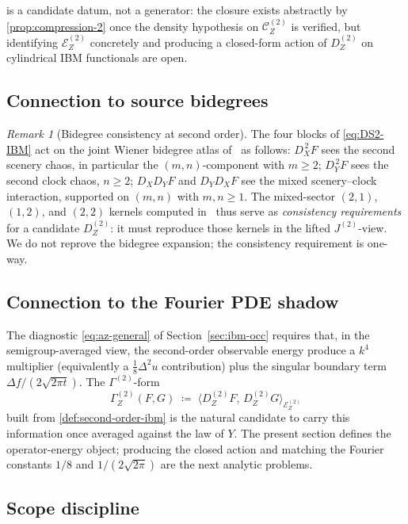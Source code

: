 \documentclass[11pt,reqno]{amsart}
\theoremstyle{plain}
\theoremstyle{definition}
\theoremstyle{remark}
\newtheorem{remark}[theorem]{Remark}
\newcommand{\Energy}{\mathcal{E}}
\newcommand{\IBM}{Z}
\newcommand{\Carre}{\Gamma}
\begin{document}
 is a candidate datum, not a generator: the
closure exists abstractly by \cref{prop:compression-2} once the density
hypothesis on $\mathcal C_\IBM^{(2)}$ is verified, but identifying
$\Energy_\IBM^{(2)}$ concretely and producing a closed-form action of
$D_\IBM^{(2)}$ on cylindrical IBM functionals are open.

\subsection*{Connection to source bidegrees}

\begin{remark}[Bidegree consistency at second order]\label{rem:bidegree-2}
The four blocks of \eqref{eq:DS2-IBM} act on the joint Wiener bidegree
atlas of~\cite{Fontes-IBMchaos} as follows: $D_X^{\,2}F$ sees the
second scenery chaos, in particular the $(m,n)$-component with
$m\ge 2$; $D_Y^{\,2}F$ sees the second clock chaos, $n\ge 2$;
$D_XD_YF$ and $D_YD_XF$ see the mixed scenery--clock interaction,
supported on $(m,n)$ with $m,n\ge 1$. The mixed-sector $(2,1)$,
$(1,2)$, and $(2,2)$ kernels computed in~\cite{Fontes-IBMchaos} thus
serve as \emph{consistency requirements} for a candidate
$D_\IBM^{(2)}$: it must reproduce those kernels in the lifted
$J^{(2)}$-view. We do not reprove the bidegree expansion; the
consistency requirement is one-way.
\end{remark}

\subsection*{Connection to the Fourier PDE shadow}

The diagnostic \eqref{eq:az-general} of Section~\ref{sec:ibm-occ}
requires that, in the semigroup-averaged view, the second-order
observable energy produce a $k^{4}$ multiplier (equivalently a
$\tfrac18\Delta^{2}u$ contribution) plus the singular boundary term
$\Delta f/(2\sqrt{2\pi t})$. The $\Carre^{(2)}$-form
\[
  \Carre^{(2)}_\IBM(F,G)
  \;\coloneqq\;\langle D_\IBM^{(2)}F,\,D_\IBM^{(2)}G\rangle_{\Energy_\IBM^{(2)}}
\]
built from \cref{def:second-order-ibm} is the natural candidate to
carry this information once averaged against the law of $Y$. The
present section defines the operator-energy object; producing the
closed action and matching the Fourier constants $1/8$ and
$1/(2\sqrt{2\pi})$ are the next analytic problems.

\subsection*{Scope discipline}
\end{document}
